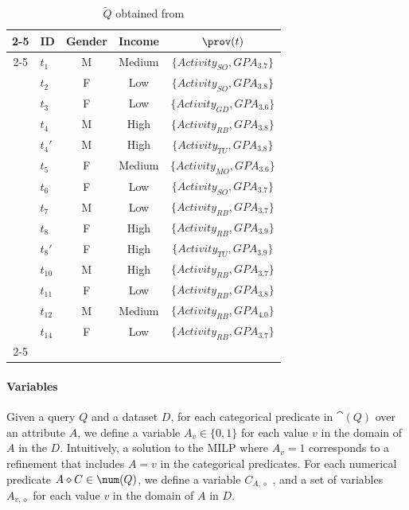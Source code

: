 \begin{table}%
        \centering	
  \caption{$\widetilde{Q}$ obtained from \running{}}
  \hspace*{-1cm}
        \footnotesize
		\begin{tabular}{clccc}
		\cline{2-5}
		& \textbf{ID} & \textbf{Gender} & \textbf{Income} &  $\prov(t)$ \\ \cline{2-5}
		 & $t_1$           & M               & Medium         & $\{Activity_{SO}, GPA_{3.7}\}$\\    
		 & $t_2$           & F               & Low         & $\{Activity_{SO}, GPA_{3.8}\}$\\    
		 & $t_3$           & F               & Low        & $\{Activity_{GD}, GPA_{3.6}\}$\\    
		& $t_4$            & M               & High     & $\{Activity_{RB}, GPA_{3.8}\}$\\
         & $t_4'$           & M               & High & $\{Activity_{TU}, GPA_{3.8}\}$\\
		 & $t_5$           & F               & Medium   & $\{Activity_{MO}, GPA_{3.6}\}$\\    
		& $t_6$            & F               & Low       & $\{Activity_{SO}, GPA_{3.7}\}$ \\    
		 & $t_7$           & M               & Low       & $\{Activity_{RB}, GPA_{3.7}\}$ \\    
		 & $t_8$           & F               & High      & $\{Activity_{RB}, GPA_{3.9}\}$\\
         & $t_{8}'$           & F               & High       & $\{Activity_{TU}, GPA_{3.9}\}$\\
		 & $t_{10}$           & M               & High  & $\{Activity_{RB}, GPA_{3.7}\}$\\    
		 & $t_{11}$           & F               & Low    & $\{Activity_{RB}, GPA_{3.8}\}$\\    
		 & $t_{12}$           & M               & Medium    & $\{Activity_{RB}, GPA_{4.0}\}$\\    
  	 &  $t_{14}$            & F               & Low       & $\{Activity_{RB}, GPA_{3.7}\}$\\ \cline{2-5} 
		\end{tabular}
  \label{tab:joined}
\end{table}

\paragraph*{Variables} Given a query $Q$ and a dataset $D$, for each categorical predicate in $\cat(Q)$ over an attribute $A$, we define a variable $A_{v} \in \{0, 1\}$ for each value $v$ in the domain of $A$ in the $D$. Intuitively, a solution to the MILP where $A_{v} = 1$ corresponds to a refinement that includes $A = v$ in the categorical predicates. For each numerical predicate $A \diamond C \in \num(Q)$, we define a variable $C_{A, \diamond}$ , and a set of variables $A_{v, \diamond}$ for each value $v$ in the domain of $A$ in $D$.

